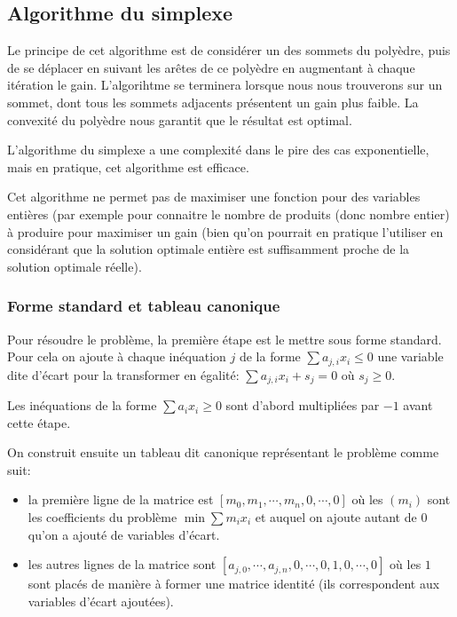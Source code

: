 \documentclass{scrartcl}
\begin{document}
  \subsection{Algorithme du simplexe}
    Le principe de cet algorithme est de considérer un des sommets du polyèdre,
    puis de se déplacer en suivant les ar\^etes de ce polyèdre en augmentant à
    chaque itération le gain. L'algorihtme se terminera lorsque nous nous 
    trouverons sur un sommet, dont tous les sommets adjacents présentent un gain
    plus faible. La convexité du polyèdre nous garantit que le résultat est 
    optimal.

    L'algorithme du simplexe a une complexité dans le pire des cas
    exponentielle, mais en pratique, cet algorithme est efficace.
    
    Cet algorithme ne permet pas de maximiser une fonction pour des variables
    entières (par exemple pour connaitre le nombre de produits (donc nombre
    entier) à produire pour maximiser un gain (bien qu'on pourrait en pratique
    l'utiliser en considérant que la solution optimale entière est suffisamment
    proche de la solution optimale réelle).

    \subsubsection{Forme standard et tableau canonique}
      Pour résoudre le problème, la première étape est le mettre sous forme
      standard. Pour cela on ajoute à chaque inéquation $j$ de la forme
      $\sum a_{j,i}x_i \leq 0$ une variable dite d'écart pour la transformer en
      égalité: $\sum a_{j,i}x_i + s_j = 0$ où $s_j \geq 0$.
      
      Les inéquations de la forme $\sum a_ix_i \geq 0$ sont d'abord multipliées
      par $-1$ avant cette étape.

      On construit ensuite un tableau dit canonique représentant le problème
      comme suit:
      \begin{itemize}
        \item la première ligne de la matrice est
          $[m_0, m_1, \cdots, m_n, 0, \cdots, 0]$ où les $(m_i)$ sont les
          coefficients du problème $\min \sum m_ix_i$ et auquel on ajoute
          autant de $0$ qu'on a ajouté de variables d'écart.
        \item les autres lignes de la matrice sont
          $[a_{j,0}, \cdots, a_{j,n}, 0, \cdots, 0, 1,0, \cdots, 0]$ où les $1$
          sont placés de manière à former une matrice identité (ils
          correspondent aux variables d'écart ajoutées).
      \end{itemize}
\end{document}
